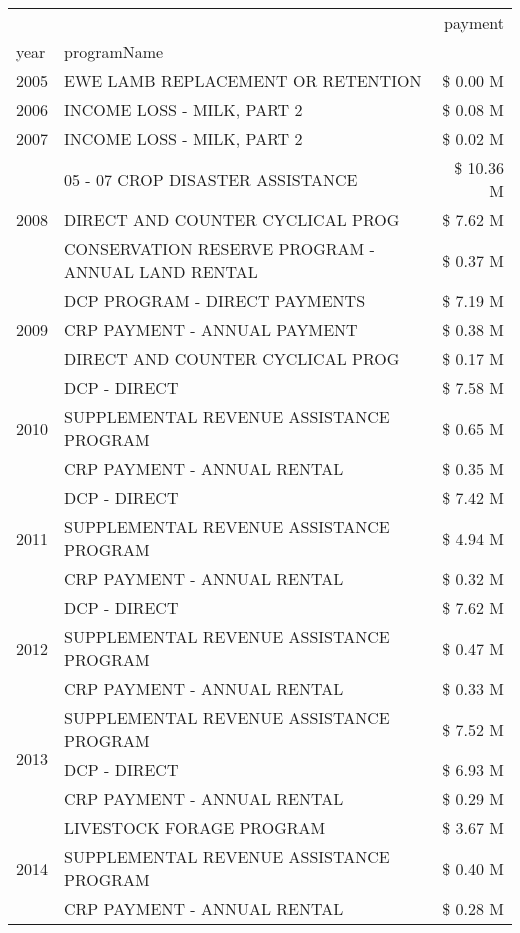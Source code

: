 \begin{tabular}{llr}
\toprule
 &  & payment \\
year & programName &  \\
\midrule
2005 & EWE LAMB REPLACEMENT OR RETENTION & \$ 0.00 M \\
\cline{1-3}
2006 & INCOME LOSS - MILK, PART 2 & \$ 0.08 M \\
\cline{1-3}
2007 & INCOME LOSS - MILK, PART 2 & \$ 0.02 M \\
\cline{1-3}
\multirow[t]{3}{*}{2008} & 05 - 07 CROP DISASTER ASSISTANCE & \$ 10.36 M \\
 & DIRECT AND COUNTER CYCLICAL PROG & \$ 7.62 M \\
 & CONSERVATION RESERVE PROGRAM - ANNUAL LAND RENTAL & \$ 0.37 M \\
\cline{1-3}
\multirow[t]{3}{*}{2009} & DCP PROGRAM - DIRECT PAYMENTS & \$ 7.19 M \\
 & CRP PAYMENT - ANNUAL PAYMENT & \$ 0.38 M \\
 & DIRECT AND COUNTER CYCLICAL PROG & \$ 0.17 M \\
\cline{1-3}
\multirow[t]{3}{*}{2010} & DCP - DIRECT & \$ 7.58 M \\
 & SUPPLEMENTAL REVENUE ASSISTANCE PROGRAM & \$ 0.65 M \\
 & CRP PAYMENT - ANNUAL RENTAL & \$ 0.35 M \\
\cline{1-3}
\multirow[t]{3}{*}{2011} & DCP - DIRECT & \$ 7.42 M \\
 & SUPPLEMENTAL REVENUE ASSISTANCE PROGRAM & \$ 4.94 M \\
 & CRP PAYMENT - ANNUAL RENTAL & \$ 0.32 M \\
\cline{1-3}
\multirow[t]{3}{*}{2012} & DCP - DIRECT & \$ 7.62 M \\
 & SUPPLEMENTAL REVENUE ASSISTANCE PROGRAM & \$ 0.47 M \\
 & CRP PAYMENT - ANNUAL RENTAL & \$ 0.33 M \\
\cline{1-3}
\multirow[t]{3}{*}{2013} & SUPPLEMENTAL REVENUE ASSISTANCE PROGRAM & \$ 7.52 M \\
 & DCP - DIRECT & \$ 6.93 M \\
 & CRP PAYMENT - ANNUAL RENTAL & \$ 0.29 M \\
\cline{1-3}
\multirow[t]{3}{*}{2014} & LIVESTOCK FORAGE PROGRAM & \$ 3.67 M \\
 & SUPPLEMENTAL REVENUE ASSISTANCE PROGRAM & \$ 0.40 M \\
 & CRP PAYMENT - ANNUAL RENTAL & \$ 0.28 M \\
\cline{1-3}

\end{tabular}
